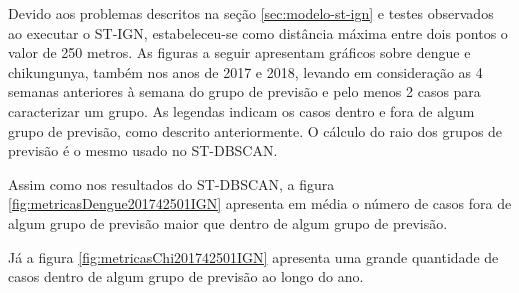 Devido aos problemas descritos na seção \ref{sec:modelo-st-ign} e testes observados ao executar o ST-IGN, estabeleceu-se como distância máxima entre dois pontos o valor de 250 metros.
As figuras a seguir apresentam gráficos sobre dengue e chikungunya, também nos anos de 2017 e 2018, levando em consideração as 4 semanas anteriores à semana do grupo de previsão e pelo menos 2 casos para caracterizar um grupo. As legendas indicam os casos dentro e fora de algum grupo de previsão, como descrito anteriormente. O cálculo do raio dos grupos de previsão é o mesmo usado no ST-DBSCAN.


Assim como nos resultados do ST-DBSCAN, a figura \ref{fig:metricasDengue201742501IGN} apresenta em média o número de casos fora de algum grupo de previsão maior que dentro de algum grupo de previsão.

\begin{figure}[!ht]
	\centering	
\end{figure}
\FloatBarrier

Já a figura \ref{fig:metricasChi201742501IGN} apresenta uma grande quantidade de casos dentro de algum grupo de previsão ao longo do ano.
\begin{figure}[!ht]
	\centering	
\end{figure}
\FloatBarrier

